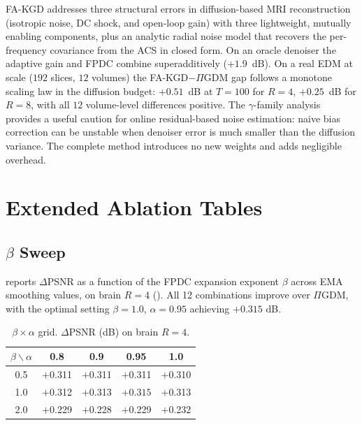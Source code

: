 \documentclass[10pt,twocolumn,letterpaper]{article}
\newcommand{\PIGDM}{$\Pi$GDM}
\begin{document}
FA-KGD addresses three structural errors in diffusion-based MRI
reconstruction (isotropic noise, DC shock, and open-loop gain) with
three lightweight, mutually enabling components, plus an analytic radial
noise model that recovers the per-frequency covariance from the ACS in
closed form. On an oracle denoiser the adaptive gain and FPDC combine
superadditively ($+1.9$~dB). On a real EDM at scale ($192$ slices, $12$
volumes) the FA-KGD$-\Pi$GDM gap follows a monotone scaling law in the
diffusion budget: $+0.51$~dB at $T{=}100$ for $R{=}4$, $+0.25$~dB for
$R{=}8$, with all $12$ volume-level differences positive. The $\gamma$-family
analysis provides a useful caution for online residual-based noise estimation:
naive bias correction can be unstable when denoiser error is much smaller than
the diffusion variance. The complete method introduces no new weights and adds
negligible overhead.




\appendix

\section{Extended Ablation Tables}
\label{app:ablations}

\subsection{\texorpdfstring{$\beta$ Sweep}{beta Sweep}}

 reports $\Delta$PSNR as a function of the FPDC
expansion exponent $\beta$ across EMA smoothing values, on brain $R=4$
(). All 12 combinations improve over \PIGDM{}, with
the optimal setting $\beta=1.0$, $\alpha=0.95$ achieving $+0.315$ dB.

\begin{table}[h]
\centering
\caption{$\beta \times \alpha$ grid. $\Delta$PSNR (dB) on brain $R=4$.}
\label{tab:beta}
\begin{tabular}{ccccc}
\toprule
$\beta \backslash \alpha$ & 0.8 & 0.9 & 0.95 & 1.0 \\
\midrule
0.5 & $+$0.311 & $+$0.311 & $+$0.311 & $+$0.310 \\
1.0 & $+$0.312 & $+$0.313 & $\mathbf{+0.315}$ & $+$0.313 \\
2.0 & $+$0.229 & $+$0.228 & $+$0.229 & $+$0.232 \\
\bottomrule
\end{tabular}
\end{table}
\end{document}
